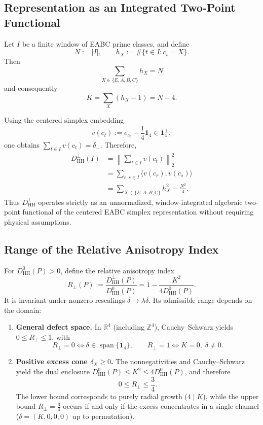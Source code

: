 \documentclass[11pt,a4paper]{article}
\begin{document}
\subsection{Representation as an Integrated Two-Point Functional}

Let \(I\) be a finite window of EABC prime classes, and define
\[
N := |I|,
\qquad
h_X := \#\{t\in I:c_t=X\}.
\]
Then
\[
\sum_{X\in\{E,A,B,C\}} h_X = N
\]
and consequently
\[
K
=
\sum_X(h_X-1)
=
N-4.
\]

Using the centered simplex embedding
\[
v(c_t)
:=
e_{c_t}-\frac14\mathbf 1_4
\in\mathbf 1_4^\perp,
\]
one obtains \(\sum_{t\in I}v(c_t) = \delta_\perp\). Therefore,
\[
\boxed{
\begin{aligned}
D_{\mathrm{HH}}^\perp(I)
&=
\left\|
\sum_{t\in I}v(c_t)
\right\|_2^2\\
&=
\sum_{r,s\in I}
\langle v(c_r),v(c_s)\rangle\\
&=
\sum_{X\in\{E,A,B,C\}}h_X^2-\frac{N^2}{4}.
\end{aligned}
}
\]
Thus \(D_{\mathrm{HH}}^\perp\) operates strictly as an unnormalized, window-integrated algebraic two-point functional of the centered EABC simplex representation without requiring physical assumptions.

\subsection{Range of the Relative Anisotropy Index}

For \(D_{\mathrm{HH}}^0(P)>0\), define the relative anisotropy index
\[
R_\perp(P)
:=
\frac{D_{\mathrm{HH}}^\perp(P)}
     {D_{\mathrm{HH}}^0(P)}
=
1-\frac{K^2}{4D_{\mathrm{HH}}^0(P)}.
\]
It is invariant under nonzero rescalings \(\delta\mapsto\lambda\delta\). Its admissible range depends on the domain:

\begin{enumerate}
\item \textbf{General defect space.} In \(\mathbb R^4\) (including \(\mathbb Z^4\)), Cauchy--Schwarz yields \(0 \le R_\perp \le 1\), with
\[
R_\perp=0 \iff \delta\in\operatorname{span}\{\mathbf 1_4\},
\qquad
R_\perp=1 \iff K=0, \; \delta\ne0.
\]

\item \textbf{Positive excess cone \(\delta_X\ge0\).}
The nonnegativities and Cauchy--Schwarz yield the dual enclosure \(D_{\mathrm{HH}}^0(P) \le K^2 \le 4D_{\mathrm{HH}}^0(P)\), and therefore
\[
\boxed{
0\le R_\perp\le\frac34.
}
\]
The lower bound corresponds to purely radial growth (\(4 \mid K\)), while the upper bound \(R_\perp = \frac{3}{4}\) occurs if and only if the excess concentrates in a single channel (\(\delta = (K,0,0,0)\) up to permutation).
\end{enumerate}
\end{document}
